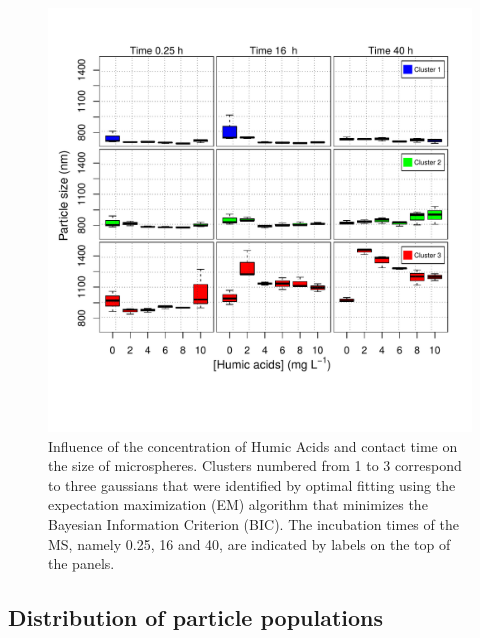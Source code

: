 \documentclass[journal=langd5,manuscript=article]{achemso}
\begin{document}
 \begin{figure}
  \includegraphics[width=\linewidth]{Figures/Boxplot_MS_HA_CaCl2_sizes.pdf}
  \caption{Influence of the concentration of Humic Acids and contact time on the  size of microspheres.  Clusters numbered from 1 to 3 correspond to three gaussians that were identified by optimal fitting using the expectation maximization (EM) algorithm  that minimizes the Bayesian Information Criterion (BIC). The incubation times of the MS,  namely 0.25, 16 and 40, are indicated by labels on the top of the panels.}
  \label{fgr:boxplot_size}
\end{figure}





\subsection{Distribution of particle populations}
\end{document}
